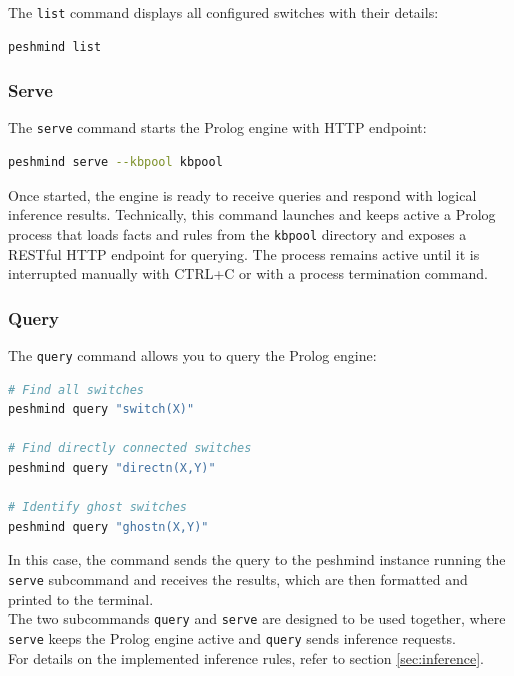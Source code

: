 \documentclass[12pt,a4paper]{article}
\begin{document}
The \texttt{list} command displays all configured switches with their details:

\begin{lstlisting}[language=bash]
peshmind list
\end{lstlisting}

\subsubsection{Serve}

The \texttt{serve} command starts the Prolog engine with HTTP endpoint:

\begin{lstlisting}[language=bash]
peshmind serve --kbpool kbpool
\end{lstlisting}

Once started, the engine is ready to receive queries and respond with logical inference results.
Technically, this command launches and keeps active a Prolog process that loads facts and rules from the
\texttt{kbpool} directory and exposes a RESTful HTTP endpoint for querying. The process remains active until it is
interrupted manually with CTRL+C or with a process termination command.

\subsubsection{Query}

The \texttt{query} command allows you to query the Prolog engine:

\begin{lstlisting}[language=bash]
# Find all switches
peshmind query "switch(X)"

# Find directly connected switches
peshmind query "directn(X,Y)"

# Identify ghost switches
peshmind query "ghostn(X,Y)"
\end{lstlisting}

In this case, the command sends the query to the peshmind instance running the \texttt{serve} subcommand and receives
the results, which are then formatted and printed to the terminal. \\
The two subcommands \texttt{query} and \texttt{serve} are designed to be used together, 
where \texttt{serve} keeps the Prolog engine active and \texttt{query} sends inference requests. \\
For details on the implemented inference rules, refer to section \ref{sec:inference}.
\end{document}
